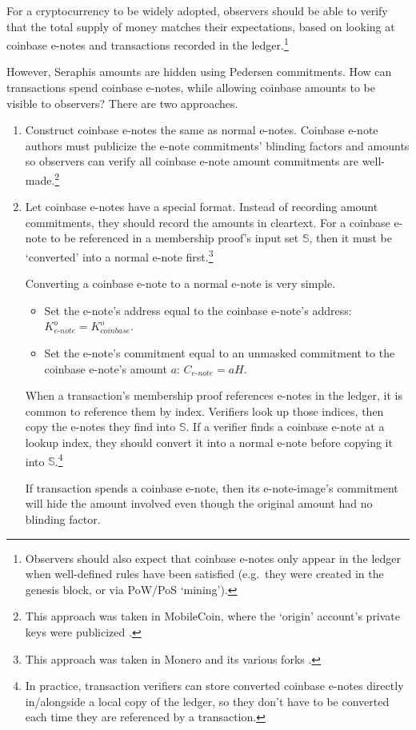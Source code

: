 For a cryptocurrency to be widely adopted, observers should be able to verify that the total supply of money matches their expectations, based on looking at coinbase e-notes and transactions recorded in the ledger.\footnote{Observers should also expect that coinbase e-notes only appear in the ledger when well-defined rules have been satisfied (e.g.\ they were created in the genesis block, or via PoW/PoS `mining').}

However, Seraphis amounts are hidden using Pedersen commitments. How can transactions spend coinbase e-notes, while allowing coinbase amounts to be visible to observers? There are two approaches.

\begin{enumerate}
    \item Construct coinbase e-notes the same as normal e-notes. Coinbase e-note authors must publicize the e-note commitments' blinding factors and amounts so observers can verify all coinbase e-note amount commitments are well-made.\footnote{This approach was taken in MobileCoin, where the `origin' account's private keys were publicized \cite{mobilecoin-governance-fees-supply}.}

    \item Let coinbase e-notes have a special format. Instead of recording amount commitments, they should record the amounts in cleartext. For a coinbase e-note to be referenced in a membership proof's input set $\mathbb{S}$, then it must be `converted' into a normal e-note first.\footnote{This approach was taken in Monero and its various forks \cite{ztm-2}.}

    Converting a coinbase e-note to a normal e-note is very simple.
    \begin{itemize}
        \item Set the e-note's address equal to the coinbase e-note's address: $K^o_{e\textrm{-}note} = K^o_{coinbase}$.
        \item Set the e-note's commitment equal to an unmasked commitment to the coinbase e-note's amount $a$: $C_{e\textrm{-}note} = a H$.
    \end{itemize}

    When a transaction's membership proof references e-notes in the ledger, it is common to reference them by index. Verifiers look up those indices, then copy the e-notes they find into $\mathbb{S}$. If a verifier finds a coinbase e-note at a lookup index, they should convert it into a normal e-note before copying it into $\mathbb{S}$.\footnote{In practice, transaction verifiers can store converted coinbase e-notes directly in/alongside a local copy of the ledger, so they don't have to be converted each time they are referenced by a transaction.}

    If transaction spends a coinbase e-note, then its e-note-image's commitment will hide the amount involved even though the original amount had no blinding factor.
\end{enumerate}


